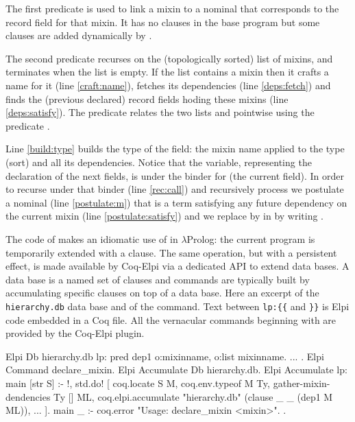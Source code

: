 \documentclass[a4paper,UKenglish,cleveref, autoref]{lipics-v2019}
\begin{document}
{{The first predicate  is used
to link a mixin to a nominal that corresponds to the record field
for that mixin. It has no clauses in the base program but some clauses
are added dynamically by .

The second predicate recurses on the (topologically sorted) list of mixins,
and terminates when the list is empty. If the list contains a mixin 
then it crafts a name for it  (line \ref{craft:name}),
fetches its dependencies (line \ref{deps:fetch}) and
finds the (previous declared) record fields hoding these mixins
(line \ref{deps:satisfy}).
The  predicate relates the two lists  and
 pointwise using the predicate .

Line \ref{build:type} builds the type of the field: the mixin name applied
to the type (sort) and all its dependencies.
Notice that the  variable, representing the declaration of the
next fields, is under the binder for  (the current field).
In order to recurse under that binder (line \ref{rec:call})
and recursively process  we postulate a nominal
 (line \ref{postulate:m}) that is a term satisfying any
future dependency on the current mixin (line \ref{postulate:satisfy})
and we replace  by  in  by writing
.

The code of  makes an idiomatic use
of \elpi{=>} in $\lambda$Prolog: the current program is temporarily
extended with a clause. The same operation, but with a persistent
effect, is made available by Coq-Elpi via a dedicated API to extend
data bases. A data base is a named set of clauses and
commands are typically built by accumulating specific clauses on top
of a data base. Here an excerpt of the \verb+hierarchy.db+ data base and
of the  command. Text between \verb+lp:{{+ and \verb+}}+
is Elpi code embedded in a Coq file. All the vernacular commands beginning
with  are provided by the Coq-Elpi plugin.

\begin{coqcode}
Elpi Db hierarchy.db lp:{{
  pred dep1 o:mixinname, o:list mixinname.
  ... %
}}.
Elpi Command declare_mixin.
Elpi Accumulate Db hierarchy.db.
Elpi Accumulate lp:{{
  main [str S] :- !, std.do! [
    coq.locate S M,
    coq.env.typeof M Ty,
    gather-mixin-dendencies Ty [] ML, %
    coq.elpi.accumulate "hierarchy.db" (clause _ _ (dep1 M ML)),
    ...
  ].
  main _ :- coq.error "Usage: declare_mixin <mixin>".
}}.
\end{coqcode}

}}
\end{document}
